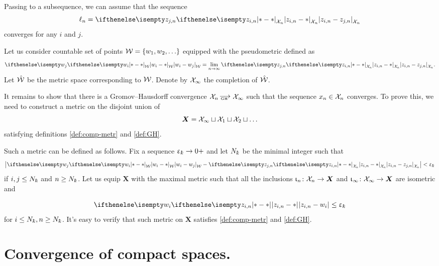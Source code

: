 Passing to a subsequence, we can assume that the sequence \[\ell_n=\dist{z_{i,n}}{z_{j,n}}{\spc{X}_n}\] 
converges for any $i$ and $j$.

Let us consider countable set of points $\spc{W}=\{w_1,w_2,\dots\}$
equipped with the pseudometric defined as 
\[\dist{w_i}{w_j}{\spc{W}}
=
\lim_{n\to\infty}\dist{z_{i,n}}{z_{j,n}}{\spc{X}_n}.\]
Let $\hat{\mathcal{W}}$ be the metric space corresponding to $\mathcal{W}$.
Denote by
$\mathcal{X}_\infty$ the completion of $\hat{\mathcal{W}}$.

It remains to show that there is a Gromov--Hausdorff convergence 
$\spc{X}_n\GHto\spc{X}_\infty$ such that the sequence $x_n\in\spc{X}_n$ converges.
To prove this, we need to construct a metric on the disjoint union of \[\bm{X}=\spc{X}_\infty\sqcup\spc{X}_1\sqcup\spc{X}_2\sqcup\dots\] 
satisfying definitions \ref{def:comp-metr} and \ref{def:GH}.

Such a  metric can be defined as follows.
Fix a sequence $\eps_\kay\to0+$
and let $N_\kay$ be the minimal integer such that
\[\left|\dist{w_i}{w_j}{\spc{W}}
-
\dist{z_{i,n}}{z_{j,n}}{\spc{X}_n}\right|<\eps_\kay
\]
if $i,j\le N_\kay$ and $n\ge N_\kay$. 
Let us equip $\bm{X}$ with the maximal metric such that all the inclusions $\iota_n\:\spc{X}_n\to\bm X$  and $\iota_\infty\:\spc{X}_\infty\to\bm X$ are isometric and 

\[
\dist{z_{i,n}}{w_i}{}\le \eps_\kay
\]
for $i\le N_\kay, n\ge N_\kay$. It's easy to verify  that such metric on $\bm X$ satisfies  \ref{def:comp-metr} and \ref{def:GH}.


\qeds

\section{Convergence of compact spaces.}

